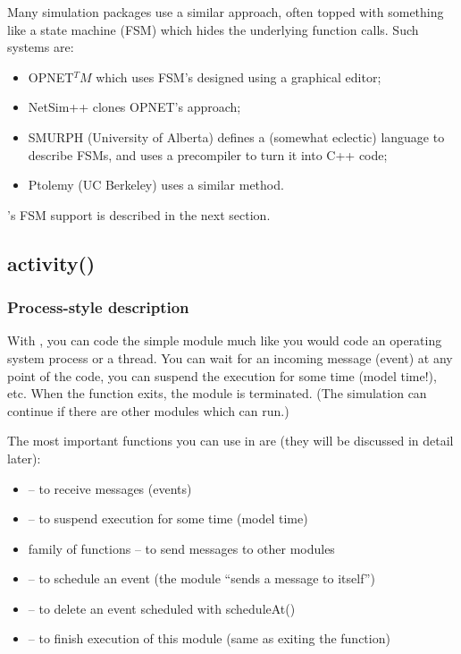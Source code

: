 Many simulation packages use a similar approach, often topped with
something like a state machine
(FSM) which hides the underlying function calls. Such
systems are:
\begin{itemize}
  \item{OPNET$^TM$ which uses FSM's designed using a graphical editor;}
  \item{NetSim++ clones OPNET's approach;}
  \item{SMURPH (University of Alberta) defines a (somewhat eclectic)
      language to describe FSMs, and uses a precompiler to turn it
      into C++ code;}
  \item{Ptolemy (UC Berkeley) uses a similar method.}
\end{itemize}

{\opp}'s FSM support is described in the next section.



\subsection{activity()}

\subsubsection{Process-style description}

With , you can code the simple
module much like you would code an operating system process or a
thread. You can wait for an incoming message (event) at any point of
the code, you can suspend the execution for some time (model time!),
etc. When the  function exits, the module is
terminated.  (The simulation can continue if there are other modules
which can run.)


The most important functions you can use in  are
(they will be discussed in detail later):
\begin{itemize}
\item{ -- to receive messages (events)}
\item{ -- to suspend execution
    for some time (model time)}
\item{ family of functions -- to send messages to other
    modules}
\item{ -- to schedule an event (the module ``sends
    a message to itself'')}
\item{ -- to delete an event scheduled with
    scheduleAt()}
\item{ -- to finish execution of this module (same as
    exiting the  function)}
\end{itemize}

